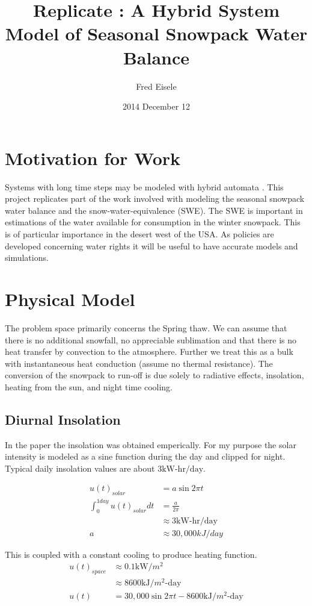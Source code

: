 \documentclass{article}
\title{Replicate : A Hybrid System Model of Seasonal Snowpack Water Balance}
\author{Fred Eisele }
\date{2014 December 12}
\begin{document}
\maketitle

\section{Motivation for Work}

Systems with long time steps may be modeled with hybrid automata
\cite{kerkez2010swb}.
This project replicates part of the work involved with modeling
the seasonal snowpack water balance and the snow-water-equivalence (SWE).
The SWE is important in estimations of the water available
for consumption in the winter snowpack.
This is of particular importance in the desert west of the USA.
As policies are developed concerning water rights it
will be useful to have accurate models and simulations.

\section{Physical Model}

The problem space primarily concerns the Spring thaw.
We can assume that there is no additional snowfall,
no appreciable sublimation and that there is no
heat transfer by convection to the atmosphere.
Further we treat this as a bulk with instantaneous
heat conduction (assume no thermal resistance).
The conversion of the snowpack to run-off is due solely
to radiative effects, insolation, heating from the sun,
and night time cooling.

\subsection{Diurnal Insolation}

In the paper the insolation was obtained emperically.
For my purpose the solar intensity is modeled as a sine
function during the day and clipped for night.
Typical daily insolation values are about $3 \text{kW-hr/day}$.

\begin{align}
u(t)_{solar} &= a \sin{2 \pi t} \\
\int_0^{1 day} u(t)_{solar} dt &= \frac{a}{2 \pi} \\
  &\approx 3 \text{kW-hr/day} \\
a &\approx 30,000 kJ/day
\end{align}

This is coupled with a constant cooling to produce heating function.
\begin{align}
u(t)_{space} &\approx 0.1 \text{kW/$m^2$} \\
   &\approx 8600 \text{kJ/$m^2$-day} \\
u(t) &= 30,000 \sin{2 \pi t} - 8600 \text{kJ/$m^2$-day}
  \label{equ:power}
\end{align}
\end{document}
